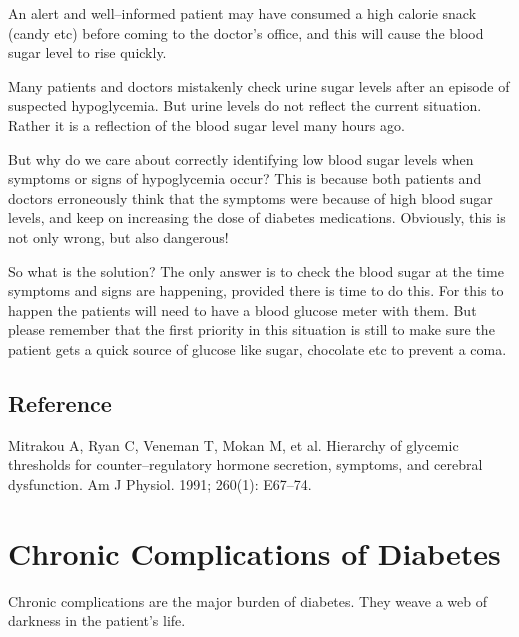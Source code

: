  \item An alert and well–informed patient may have consumed a high calorie snack (candy etc) before coming to the doctor’s office, and this will cause the blood sugar level to rise quickly.

 \item Many patients and doctors mistakenly check urine sugar levels after an episode of suspected hypoglycemia. But urine levels do not reflect the current situation. Rather it is a reflection of the blood sugar level many hours ago.

But why do we care about correctly identifying low blood sugar levels when symptoms or signs of hypoglycemia occur? This is because both patients and doctors erroneously think that the symptoms were because of high blood sugar levels, and keep on increasing the dose of diabetes medications. Obviously, this is not only wrong, but also dangerous!

So what is the solution? The only answer is to check the blood sugar at the time symptoms and signs are happening, provided there is time to do this. For this to happen the patients will need to have a blood glucose meter with them. But please remember that the first priority in this situation is still to make sure the patient gets a quick source of glucose like sugar, chocolate etc to prevent a coma.

\section*{Reference}

\begin{thebibliography}{99}
 Mitrakou A, Ryan C, Veneman T, Mokan M, et al. Hierarchy of glycemic thresholds for counter–regulatory hormone secretion, symptoms, and cerebral dysfunction. Am J Physiol. 1991; 260(1): E67–74.

 \end{thebibliography}


\chapter{Chronic Complications of Diabetes}

\begin{center}
\end{center}

Chronic complications are the major burden of diabetes. They weave a web of darkness in the patient’s life.

